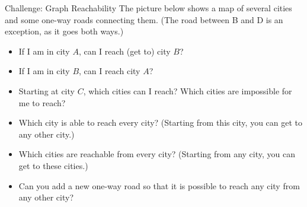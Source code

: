 \documentclass[12pt,letterpaper]{article}
\begin{document}
\begin{problem}{Challenge: Graph Reachability}
  The picture below shows a map of several cities and some one-way roads connecting them.
  (The road between B and D is an exception, as it goes both ways.)

  \begin{center}
  \end{center}

  \begin{itemize}
    \item If I am in city \(A\), can I reach (get to) city \(B\)? 
    \item If I am in city \(B\), can I reach city \(A\)? 
    \item Starting at city \(C\), which cities can I reach? Which cities are impossible for
    me to reach? 
    \item Which city is able to reach every city? (Starting from this city, you can get to
    any other city.) 
    \item Which cities are reachable from every city? (Starting from any city, you can get
    to these cities.) 
    \item Can you add a new one-way road so that it is possible to reach any city from any
    other city? 
  \end{itemize}
\end{problem}
\end{document}

